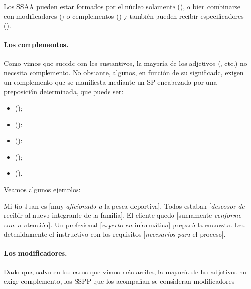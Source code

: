 Los SSAA pueden estar formados por el núcleo solamente (), o bien combinarse con modificadores
() o complementos () y también pueden recibir
especificadores ().

\paragraph{Los complementos.} Como vimos que sucede con los sustantivos, la
mayoría de los adjetivos (, etc.) no necesita
complemento. No obstante, algunos, en función de su significado, exigen un
complemento que se manifiesta mediante un SP encabezado por una preposición
determinada, que puede ser:

\begin{itemize}
  \item {} ();
  \item {} ();
  \item {} ();
  \item {} ();
  \item {} ().
\end{itemize}

Veamos algunos ejemplos:

\begin{exe}
  \ex Mi tío Juan es [muy \textit{aficionado a} la pesca deportiva].
  \ex Todos estaban [\textit{deseosos de} recibir al nuevo integrante de la
      familia].
  \ex El cliente quedó [sumamente \textit{conforme con} la atención].
  \ex Un profesional [\textit{experto en} informática] preparó la encuesta.
  \ex Lea detenidamente el instructivo con los requisitos [\textit{necesarios
      para} el proceso].
\end{exe}

\paragraph{Los modificadores.} Dado que, salvo en los casos que vimos más arriba,
la mayoría de los adjetivos no exige complemento, los SSPP que los acompañan se
consideran modificadores:

